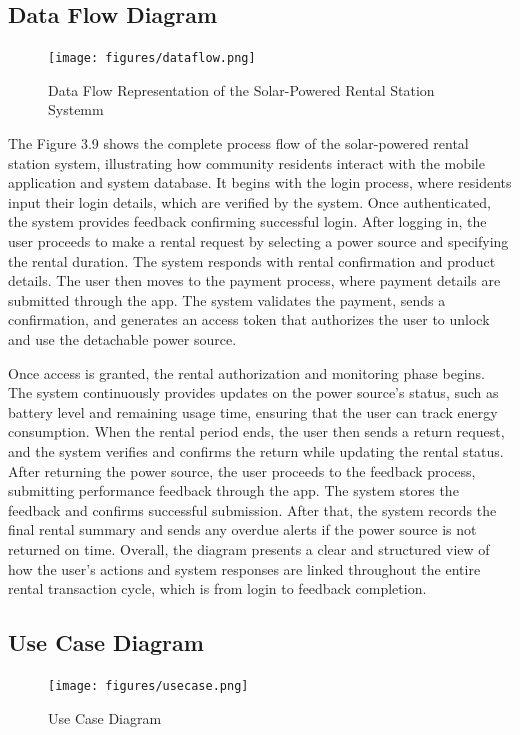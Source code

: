 {\subsection{Data Flow Diagram}
\begin{figure}[H]
	\centering
	\caption{Data Flow Representation of the Solar-Powered Rental Station Systemm}
	\label{fig:data flow}
	\texttt{[image: figures/dataflow.png]}
\end{figure}
	
The Figure 3.9 shows the complete process flow of the solar-powered rental station system, illustrating how community residents interact with the mobile application and system database. It begins with the login process, where residents input their login details, which are verified by the system. Once authenticated, the system provides feedback confirming successful login. After logging in, the user proceeds to make a rental request by selecting a power source and specifying the rental duration. The system responds with rental confirmation and product details. The user then moves to the payment process, where payment details are submitted through the app. The system validates the payment, sends a confirmation, and generates an access token that authorizes the user to unlock and use the detachable power source.

Once access is granted, the rental authorization and monitoring phase begins. The system continuously provides updates on the power source’s status, such as battery level and remaining usage time, ensuring that the user can track energy consumption. When the rental period ends, the user then sends a return request, and the system verifies and confirms the return while updating the rental status. After returning the power source, the user proceeds to the feedback process, submitting performance feedback through the app. The system stores the feedback and confirms successful submission. After that, the system records the final rental summary and sends any overdue alerts if the power source is not returned on time. Overall, the diagram presents a clear and structured view of how the user’s actions and system responses are linked throughout the entire rental transaction cycle, which is from login to feedback completion.

\subsection{Use Case Diagram}
 \begin{figure}[H]
 	\centering
 	\caption{Use Case Diagram}
 	\label{fig:use case}
 	\texttt{[image: figures/usecase.png]}
 \end{figure}
 
}
